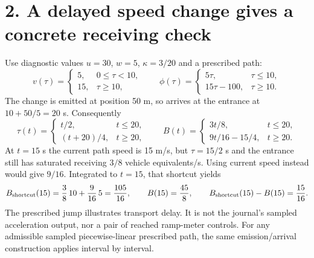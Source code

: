 \documentclass[11pt,a4paper]{article}
\begin{document}
\newpage
\section*{2. A delayed speed change gives a concrete receiving check}
Use diagnostic values $u=30$, $w=5$, $\kappa=3/20$ and a prescribed path:
\begin{equation}
 v(\tau)=
 \begin{cases}5,&0\le\tau<10,\\15,&\tau\ge10,\end{cases}
 \qquad
 \phi(\tau)=
 \begin{cases}5\tau,&\tau\le10,\\15\tau-100,&\tau\ge10.\end{cases}
\end{equation}
The change is emitted at position 50 m, so arrives at the entrance at
$10+50/5=20$ s. Consequently
\begin{equation}
 \tau(t)=
 \begin{cases}t/2,&t\le20,\\(t+20)/4,&t\ge20,\end{cases}
 \qquad
 B(t)=
 \begin{cases}3t/8,&t\le20,\\9t/16-15/4,&t\ge20.\end{cases}
\end{equation}
At $t=15$ s the current path speed is 15 m/s, but $\tau=15/2$ s and the
entrance still has saturated receiving $3/8$ vehicle equivalents/s.
Using current speed instead would give $9/16$. Integrated to $t=15$, that
shortcut yields
\begin{equation}
 B_{\rm shortcut}(15)=\frac38\,10+\frac9{16}\,5=\frac{105}{16},
 \qquad B(15)=\frac{45}{8},\qquad
 B_{\rm shortcut}(15)-B(15)=\frac{15}{16}.
\end{equation}
The prescribed jump illustrates transport delay. It is not the journal's
sampled acceleration output, nor a pair of reached ramp-meter controls.
For any admissible sampled piecewise-linear prescribed path, the same
emission/arrival construction applies interval by interval.
\end{document}
